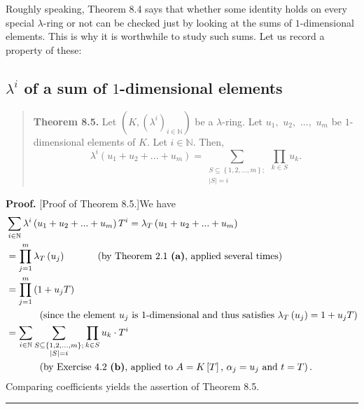 \documentclass[numbers=enddot,12pt,final,onecolumn,notitlepage]{scrartcl}%
\newenvironment{proof}[1][Proof]{\noindent\textbf{#1.} }{\ \rule{0.5em}{0.5em}}
\begin{document}
Roughly speaking, Theorem 8.4 says that whether some identity holds on every
special $\lambda$-ring or not can be checked just by looking at the sums of
$1$-dimensional elements. This is why it is worthwhile to study such sums. Let
us record a property of these:

\subsection{$\lambda^{i}$ of a sum of $1$-dimensional elements}

\begin{quote}
\textbf{Theorem 8.5.} Let $\left(  K,\left(  \lambda^{i}\right)
_{i\in\mathbb{N}}\right)  $ be a $\lambda$-ring. Let $u_{1},$ $u_{2},$ $...,$
$u_{m}$ be $1$-dimensional elements of $K$. Let $i\in\mathbb{N}$. Then,%
\[
\lambda^{i}\left(  u_{1}+u_{2}+...+u_{m}\right)  =\sum_{\substack{S\subseteq
\left\{  1,2,...,m\right\}  ;\\\left\vert S\right\vert =i}}\prod_{k\in S}%
u_{k}.
\]



\end{quote}

\begin{proof}
[Proof of Theorem 8.5.]We have%
\begin{align*}
&  \sum_{i\in\mathbb{N}}\lambda^{i}\left(  u_{1}+u_{2}+...+u_{m}\right)
T^{i}=\lambda_{T}\left(  u_{1}+u_{2}+...+u_{m}\right) \\
&  =\prod_{j=1}^{m}\lambda_{T}\left(  u_{j}\right)
\ \ \ \ \ \ \ \ \ \ \left(  \text{by Theorem 2.1 \textbf{(a)}, applied several
times}\right) \\
&  =\prod_{j=1}^{m}\left(  1+u_{j}T\right) \\
&  \ \ \ \ \ \ \ \ \ \ \left(  \text{since the element }u_{j}\text{ is
}1\text{-dimensional and thus satisfies }\lambda_{T}\left(  u_{j}\right)
=1+u_{j}T\right) \\
&  =\sum_{i\in\mathbb{N}}\sum\limits_{\substack{S\subseteq\left\{
1,2,...,m\right\}  ;\\\left\vert S\right\vert =i}}\prod\limits_{k\in S}%
u_{k}\cdot T^{i}\\
&  \ \ \ \ \ \ \ \ \ \ \left(  \text{by Exercise 4.2 \textbf{(b)}, applied to
}A=K\left[  T\right]  \text{, }\alpha_{j}=u_{j}\text{ and }t=T\right)  .
\end{align*}
Comparing coefficients yields the assertion of Theorem 8.5.
\end{proof}
\end{document}

